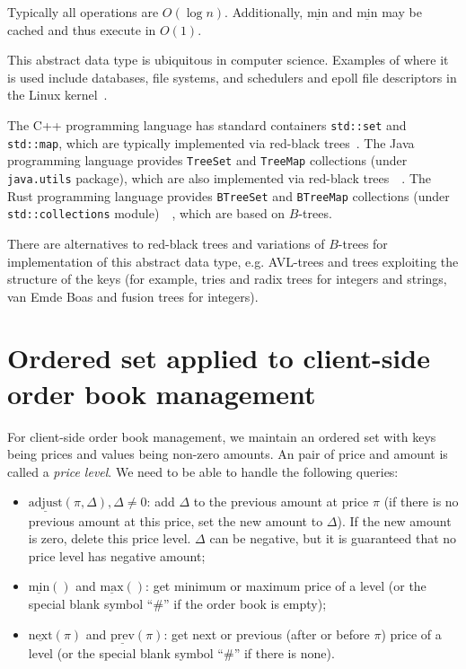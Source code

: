 \documentclass[a4paper,12pt]{article}
\begin{document}
Typically all operations are $O(\log n).$ Additionally, $\underline{\mathrm{min}}$ and $\underline{\mathrm{min}}$
may be cached and thus execute in $O(1).$

This abstract data type is ubiquitous in computer science. Examples of where it is used include databases, file systems,
and schedulers and epoll file descriptors in the Linux kernel~\cite{linux_rb}.

The C++ programming language has standard containers \texttt{std::set} and \texttt{std::map}, which are typically implemented via red-black trees~\cite{pl_cxx}.
The Java programming language provides \texttt{TreeSet} and \texttt{TreeMap} collections (under \texttt{java.utils} package), which are also implemented via red-black trees~\cite{pl_java_treemap}~\cite{pl_java_treeset}.
The Rust programming language provides \texttt{BTreeSet} and \texttt{BTreeMap} collections (under \texttt{std::collections} module)~\cite{pl_rust_set}~\cite{pl_rust_map}, which are based on $B$-trees.

There are alternatives to red-black trees and variations of $B$-trees for implementation of this abstract data type, e.g. AVL-trees and trees exploiting the structure of the keys (for example, tries and radix trees for integers and strings, van Emde Boas and fusion trees for integers).

\section{Ordered set applied to client-side order book management}

For client-side order book management, we maintain an ordered set with keys being prices and values being non-zero amounts. An pair of price and amount is called a \textit{price level}. We need to be able to handle the following queries:
\begin{itemize}
    \item $\underline{\mathrm{adjust}}(\pi, \Delta), \Delta \ne 0$: add $\Delta$ to the previous amount at price $\pi$ (if there is no previous amount at this price, set the new amount to $\Delta$). If the new amount is zero, delete this price level. $\Delta$ can be negative, but it is guaranteed that no price level has negative amount;
    \item $\underline{\mathrm{min}}()$ and $\underline{\mathrm{max}}()$: get minimum or maximum price of a level (or the special blank symbol ``$\#$'' if the order book is empty);
    \item $\underline{\mathrm{next}}(\pi)$ and $\underline{\mathrm{prev}}(\pi)$: get next or previous (after or before $\pi$) price of a level (or the special blank symbol ``$\#$'' if there is none).
\end{itemize}
\end{document}

